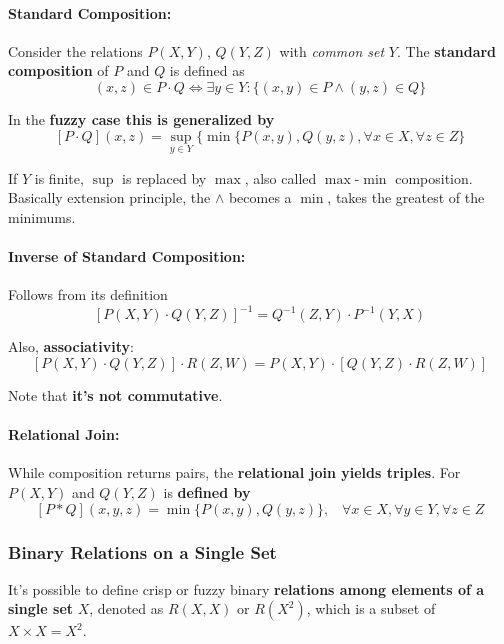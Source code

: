\paragraph{Standard Composition:} Consider the relations $P(X,Y)$, $Q(Y,Z)$ with \textit{common set} $Y$. The \textbf{standard composition} of $P$ and $Q$ is defined as
$$ (x,z) \in P \cdot Q \Leftrightarrow \exists y \in Y : \{(x,y) \in P \wedge (y,z) \in Q \} $$

In the \textbf{fuzzy case this is generalized by} 
$$ [P \cdot Q](x,z) = \sup_{y \in Y} \{\min \{P(x,y), Q(y,z), \forall x \in X, \forall z \in Z \} $$

If $Y$ is finite, $\sup$ is replaced by $\max$, also called $\max$-$\min$ composition. \\
Basically extension principle, the $\wedge$ becomes a $\min$, takes the greatest of the minimums.\\

\paragraph{Inverse of Standard Composition:} Follows from its definition
$$ [P(X,Y) \cdot Q(Y,Z)]^{-1} = Q^{-1} (Z,Y) \cdot P^{-1} (Y, X) $$

Also, \textbf{associativity}: 
$$ [P(X,Y) \cdot Q(Y,Z)] \cdot R (Z,W) = P(X,Y) \cdot [Q(Y,Z) \cdot R(Z,W)] $$

Note that \textbf{it's not commutative}.\\

\paragraph{Relational Join:} While composition returns pairs, the \textbf{relational join yields triples}. For $P(X,Y)$ and $Q(Y,Z)$ is \textbf{defined by }
$$ [P \ast Q] (x,y,z) = \min\{ P(x,y), Q(y,z)\}, \;\;\; \forall x \in X, \forall y \in Y, \forall z \in Z $$

\newpage

\subsubsection{Binary Relations on a Single Set}

It's possible to define crisp or fuzzy binary \textbf{relations among elements of a single set} $X$, denoted as $R(X,X)$ or $R(X^2)$, which is a subset of $X \times X = X^2$.\\

